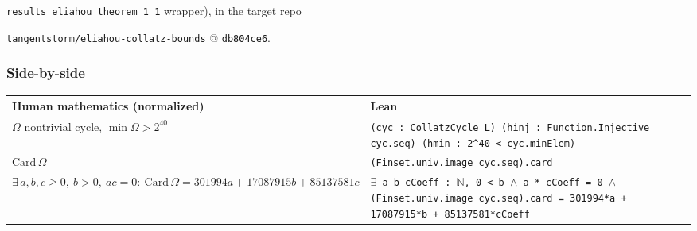 \documentclass[11pt]{article}
\begin{document}
\texttt{results\_eliahou\_theorem\_1\_1} wrapper), in the target repo

\texttt{tangentstorm/eliahou-collatz-bounds} @ \texttt{db804ce6}.

\subsubsection*{Side-by-side}
\begin{center}\small\begin{tabular}{p{}p{}}\toprule
Human mathematics (normalized) & Lean \\ \midrule
$\Omega$ nontrivial cycle, $\min\Omega > 2^{40}$ & \texttt{(cyc : CollatzCycle L) (hinj : Function.Injective cyc.seq) (hmin : 2\textasciicircum{}40 < cyc.minElem)} \\
$\mathrm{Card}\,\Omega$ & \texttt{(Finset.univ.image cyc.seq).card} \\
$\exists\, a,b,c\ge 0,\ b>0,\ ac=0:\ \mathrm{Card}\,\Omega = 301994a+17087915b+85137581c$ & \texttt{\ensuremath{\exists} a b cCoeff : \ensuremath{\mathbb{N}}, 0 < b \ensuremath{\wedge} a * cCoeff = 0 \ensuremath{\wedge} (Finset.univ.image cyc.seq).card = 301994*a + 17087915*b + 85137581*cCoeff} \\
\bottomrule\end{tabular}\end{center}
\end{document}
